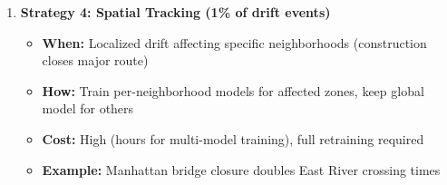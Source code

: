 \begin{enumerate}
        For each historical scenario, the training dataset includes:
        \begin{itemize}
            \item \textbf{Input $\mathbf{x}$:} 6D meta-metrics vector (null\_rate, violation\_rate, anomaly\_rate, volume, dedup\_rate, $\Delta$\_score)
            \item \textbf{Output $\mathbf{y}$:} Optimal parameter shift that resolved the drift (e.g., centroid displacement vector)
        \end{itemize}

        \textbf{Hypernetwork Prediction:} At runtime, when INCREMENTAL\_DRIFT is detected, METER operates as follows:

        \begin{enumerate}
            \item IEC computes current meta-metrics: $\mathbf{x}_{\text{current}} = [\text{null\_rate}, \text{violation\_rate}, \ldots]$
            \item METER hypernetwork predicts optimal strategy: $y_{\text{pred}} = \text{MLPClassifier}(\mathbf{x}_{\text{current}})$ where $y_{\text{pred}} \in \{0, 1, 2, 3\}$
            \item IEC executes the predicted strategy (do\_nothing, adjust\_threshold, retrain\_model, or switch\_model)
            \item New model is serialized and broadcast via Broadcast State
        \end{enumerate}

        \textbf{Why Meta-Learning?} METER learns \emph{how to adapt} from past drift events rather than learning the data distribution itself. This allows rapid adaptation by reusing knowledge from similar historical drifts, reducing adaptation overhead compared to full retraining from scratch.

    \item \textbf{Strategy 4: Spatial Tracking (1\% of drift events)}
        \begin{itemize}
            \item \textbf{When:} Localized drift affecting specific neighborhoods (construction closes major route)
            \item \textbf{How:} Train per-neighborhood models for affected zones, keep global model for others
            \item \textbf{Cost:} High (hours for multi-model training), full retraining required
            \item \textbf{Example:} Manhattan bridge closure doubles East River crossing times
        \end{itemize}
    \end{enumerate}

